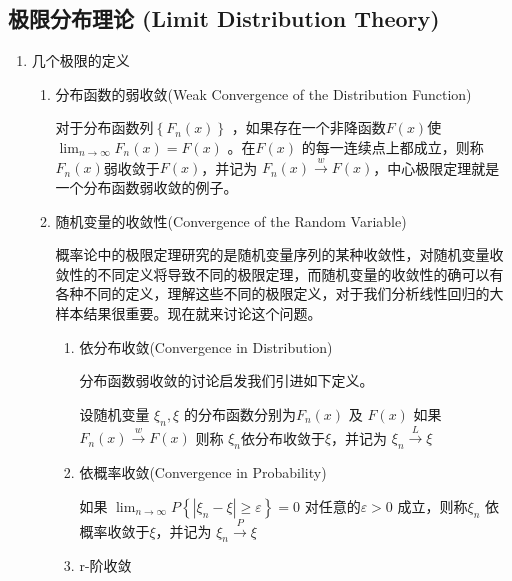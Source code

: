\subsection{极限分布理论 (Limit Distribution Theory) }
	\begin{enumerate}[1]
		\item 几个极限的定义
			\begin{enumerate}[1)]
				\item 分布函数的弱收敛(Weak Convergence of the Distribution Function)
				
				\begin{mydef}
					对于分布函数列$ \left\{F_{n}(x)\right\} $ ，如果存在一个非降函数$F(x) $使 
					$ \lim_{n \rightarrow \infty} F_{n}(x)=F(x) $ 。在$ F(x) $ 的每一连续点上都成立，则称
				$ F_{n}(x) $弱收敛于$ F(x) $，并记为 
				$ F_{n}(x) \stackrel{w}{\longrightarrow} F(x) $，中心极限定理就是一个分布函数弱收敛的例子。
				\end{mydef}
					
				\item 随机变量的收敛性(Convergence of the Random Variable)
				\setlength{\parindent}{2\ccwd}
				
				概率论中的极限定理研究的是随机变量序列的某种收敛性，对随机变量收敛性的不同定义将导致不同的极限定理，而随机变量的收敛性的确可以有各种不同的定义，理解这些不同的极限定义，对于我们分析线性回归的大样本结果很重要。现在就来讨论这个问题。
				
					\begin{enumerate}[ a) ]
						\item 依分布收敛(Convergence in Distribution)
						
						分布函数弱收敛的讨论启发我们引进如下定义。
						
						\begin{mydef}[依分布收敛]  
							设随机变量 $ \xi_{n}, \xi $ 的分布函数分别为$ F_{n}(x) $
						及 $ F(x) $ 如果 $ F_{n}(x) \stackrel{w}{\longrightarrow} F(x) $ 则称 $ \xi_{n} $依分布收敛于$  \xi $，并记为 $ \xi_{n} \stackrel{L}{\longrightarrow} \xi $
						\end{mydef}
						
						\item 依概率收敛(Convergence in Probability)
						
						\begin{mydef}[依概率收敛]   如果 $ \lim_{n \rightarrow \infty} P\left\{\left|\xi_{n}-\xi\right| \geq \varepsilon\right\}=0 $ 
						对任意的$   \varepsilon > 0 $ 成立，则称$ \xi_{n} $ 依概率收敛于$ \xi $，并记为 $ \xi_{n} \stackrel{P}{\longrightarrow} \xi $
						\end{mydef}
						\item r-阶收敛
						

\end{enumerate}
\end{enumerate}
\end{enumerate}
